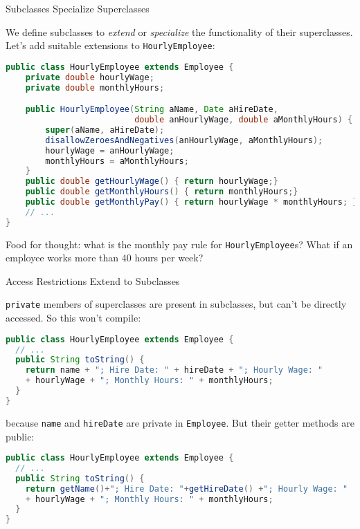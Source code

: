\documentclass{beamer}
\begin{document}
\begin{frame}[fragile]{Subclasses Specialize Superclasses}


We define subclasses to {\it extend} or {\it specialize} the functionality of their superclasses.  Let's add suitable extensions to {\tt HourlyEmployee}:
\vspace{-.05in}
\begin{lstlisting}[language=Java]
public class HourlyEmployee extends Employee {
    private double hourlyWage;
    private double monthlyHours;

    public HourlyEmployee(String aName, Date aHireDate,
                          double anHourlyWage, double aMonthlyHours) {
        super(aName, aHireDate);
        disallowZeroesAndNegatives(anHourlyWage, aMonthlyHours);
        hourlyWage = anHourlyWage;
        monthlyHours = aMonthlyHours;
    }
    public double getHourlyWage() { return hourlyWage;}
    public double getMonthlyHours() { return monthlyHours;}
    public double getMonthlyPay() { return hourlyWage * monthlyHours; }
    // ...
}
\end{lstlisting}
\vspace{-.1in}
Food for thought: what is the monthly pay rule for {\tt HourlyEmployee}s?  What if an employee works more than 40 hours per week?
\end{frame}

\begin{frame}[fragile]{Access Restrictions Extend to Subclasses}


{\tt private} members of superclasses are present in subclasses, but can't be directly accessed.  So this won't compile:
\vspace{-.05in}
\begin{lstlisting}[language=Java]
public class HourlyEmployee extends Employee {
  // ...
  public String toString() {
    return name + "; Hire Date: " + hireDate + "; Hourly Wage: "
    + hourlyWage + "; Monthly Hours: " + monthlyHours;
  }
}
\end{lstlisting}
because {\tt name} and {\tt hireDate} are private in {\tt Employee}.  But their getter methods are public:
\vspace{-.05in}
\begin{lstlisting}[language=Java]
public class HourlyEmployee extends Employee {
  // ...
  public String toString() {
    return getName()+"; Hire Date: "+getHireDate() +"; Hourly Wage: "
    + hourlyWage + "; Monthly Hours: " + monthlyHours;
  }
}
\end{lstlisting}


\end{frame}
\end{document}
